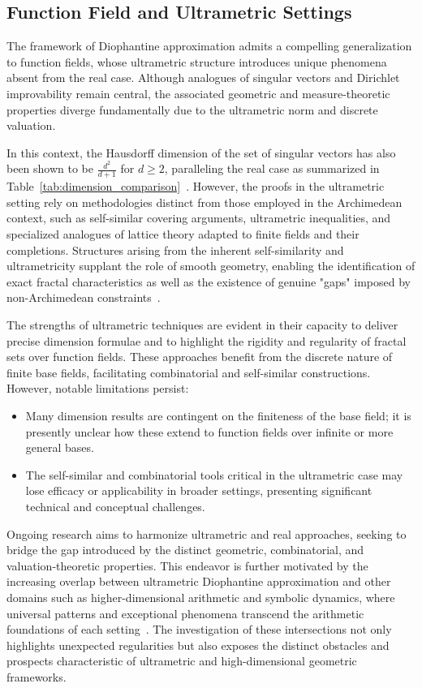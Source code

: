 \documentclass[sigconf]{acmart}
\begin{document}
\subsection{Function Field and Ultrametric Settings}

The framework of Diophantine approximation admits a compelling generalization to function fields, whose ultrametric structure introduces unique phenomena absent from the real case. Although analogues of singular vectors and Dirichlet improvability remain central, the associated geometric and measure-theoretic properties diverge fundamentally due to the ultrametric norm and discrete valuation.

In this context, the Hausdorff dimension of the set of singular vectors has also been shown to be $\frac{d^2}{d+1}$ for $d \geq 2$, paralleling the real case as summarized in Table~\ref{tab:dimension_comparison}~\cite{ref79}. However, the proofs in the ultrametric setting rely on methodologies distinct from those employed in the Archimedean context, such as self-similar covering arguments, ultrametric inequalities, and specialized analogues of lattice theory adapted to finite fields and their completions. Structures arising from the inherent self-similarity and ultrametricity supplant the role of smooth geometry, enabling the identification of exact fractal characteristics as well as the existence of genuine "gaps" imposed by non-Archimedean constraints~\cite{ref79}.

The strengths of ultrametric techniques are evident in their capacity to deliver precise dimension formulae and to highlight the rigidity and regularity of fractal sets over function fields. These approaches benefit from the discrete nature of finite base fields, facilitating combinatorial and self-similar constructions. However, notable limitations persist:

\begin{itemize}
    \item Many dimension results are contingent on the finiteness of the base field; it is presently unclear how these extend to function fields over infinite or more general bases.
    \item The self-similar and combinatorial tools critical in the ultrametric case may lose efficacy or applicability in broader settings, presenting significant technical and conceptual challenges.
\end{itemize}

Ongoing research aims to harmonize ultrametric and real approaches, seeking to bridge the gap introduced by the distinct geometric, combinatorial, and valuation-theoretic properties. This endeavor is further motivated by the increasing overlap between ultrametric Diophantine approximation and other domains such as higher-dimensional arithmetic and symbolic dynamics, where universal patterns and exceptional phenomena transcend the arithmetic foundations of each setting~\cite{ref79,ref109}. The investigation of these intersections not only highlights unexpected regularities but also exposes the distinct obstacles and prospects characteristic of ultrametric and high-dimensional geometric frameworks.
\end{document}
